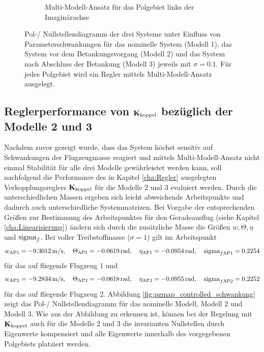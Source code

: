 \begin{figure}[h]
\begin{subfigure}{.49\textwidth}
		\caption{Multi-Modell-Ansatz für das Polgebiet links der Imaginärachse}
		\label{fig:pzmap_multi_modell_10prozent_imag}
	\end{subfigure}
	\caption{Pol-/ Nullstellendiagramm der drei Systeme unter Einfluss von Parameterschwankungen für das nominelle System (Modell 1), das System vor dem Betankungsvorgang (Modell 2) und das System nach Abschluss der Betankung (Modell 3) jeweils mit $\sigma=0.1$. Für jedes Polgebiet wird ein Regler mittels Multi-Modell-Ansatz ausgelegt.}
	\label{fig:pzmap_multi_modell_ansatz}
\end{figure}

\subsection{Reglerperformance von ${\boldsymbol{\mathrm{K}}}_{\textnormal{koppel}}$ bezüglich der Modelle 2 und 3}
Nachdem zuvor gezeigt wurde, dass das System höchst sensitiv auf Schwankungen der Flugzeugmasse reagiert und mittels Multi-Modell-Ansatz nicht einmal Stabilität für alle drei Modelle gewährleistet werden kann, soll nachfolgend die Performance des in Kapitel \ref{cha:Regler} ausgelegten Verkopplungsreglers ${\boldsymbol{\mathrm{K}}}_{\textnormal{koppel}}$ für die Modelle 2 und 3 evaluiert werden. Durch die unterschiedlichen Massen ergeben sich leicht abweichende Arbeitspunkte und dadurch auch unterschiedliche Systemmatrizen. Bei Vorgabe der entsprechenden Größen zur Bestimmung des Arbeitspunktes für den Geradeausflug (siehe Kapitel \ref{cha:Linearisierung}) ändern sich durch die zusätzliche Masse die Größen $w, \Theta, \eta$ und $\textnormal{sigma}_f$. Bei voller Treibstoffmasse ($\sigma=1$) gilt im Arbeitspunkt
\begin{align*}
w_{\textnormal{AP1}} = -9.3012\,\mathrm{m/s}, \quad \Theta_{\textnormal{AP1}} = -0.0619\,\mathrm{rad}, \quad \eta_{\textnormal{AP1}} = -0.0954\,\mathrm{rad}, \quad \textnormal{sigma}_{f\textnormal{AP1}} = 0.2254
\end{align*}
für das auf  fliegende Flugzeug 1 und 
\begin{align*}
w_{\textnormal{AP2}} = -9.2834\,\mathrm{m/s}, \quad \Theta_{\textnormal{AP2}} = -0.0618\,\mathrm{rad}, \quad \eta_{\textnormal{AP2}} = -0.0955\,\mathrm{rad}, \quad \textnormal{sigma}_{f\textnormal{AP2}} = 0.2252
\end{align*}
für das auf  fliegende Flugzeug 2. Abbildung \ref{fig:pzmap_controlled_schwankung} zeigt das Pol-/ Nullstellendiagramm für das nominelle Modell, Modell 2 und Modell 3. Wie aus der Abbildung zu erkennen ist, können bei der Regelung mit ${\boldsymbol{\mathrm{K}}}_{\textnormal{koppel}}$ auch für die Modelle 2 und 3 die invarianten Nullstellen durch Eigenwerte kompensiert und alle Eigenwerte innerhalb des vorgegebenen Polgebiets platziert werden.
